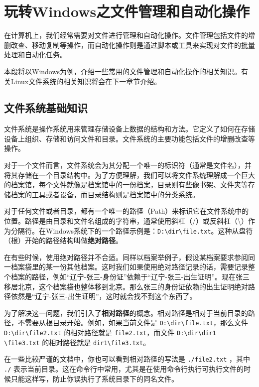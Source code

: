 \documentclass[../main.tex]{subfiles}
\begin{document}
\section{玩转Windows之文件管理和自动化操作}\label{sec:windows-file-management}

在计算机上，我们经常需要对文件进行管理和自动化操作。文件管理包括文件的增删改查、移动复制等操作，而自动化操作则是通过脚本或工具来实现对文件的批量处理和自动化任务。

本段将以Windows为例，介绍一些常用的文件管理和自动化操作的相关知识。有关Linux文件系统的相关知识将会在下一章节介绍。

\subsection{文件系统基础知识}

文件系统是操作系统用来管理存储设备上数据的结构和方法。它定义了如何在存储设备上组织、存储和访问文件和目录。文件系统的主要功能包括文件的增删改查等操作。

对于一个文件而言，文件系统会为其分配一个唯一的标识符（通常是文件名），并将其存储在一个目录结构中。为了方便理解，我们可以将文件系统理解成一个巨大的档案馆，每个文件就像是档案馆中的一份档案，目录则有些像书架、文件夹等存储档案的工具或者设备，而目录结构则是档案馆中的分类系统。

对于任何文件或者目录，都有一个唯一的路径（Path）来标识它在文件系统中的位置。路径是由目录和文件名组成的字符串，通常使用斜杠（/）或反斜杠（\textbackslash）作为分隔符。在Windows系统下的一个路径示例是：\texttt{D:\textbackslash dir\textbackslash file.txt}。这种从盘符（根）开始的路径结构叫做\textbf{绝对路径}。

在有些时候，使用绝对路径并不合适。同样以档案举例子，假设某档案要求参阅同一档案袋里的某一份其他档案。这时我们如果使用绝对路径记录的话，需要记录整个档案的路径，例如“辽宁-张三-身份证”依赖于“辽宁-张三-出生证明”。现在张三移居北京，这个档案袋也整体移到北京。那么张三的身份证依赖的出生证明绝对路径依然是“辽宁-张三-出生证明”，这时就会找不到这个东西了。

为了解决这一问题，我们引入了\textbf{相对路径}的概念。相对路径是相对于当前目录的路径，不需要从根目录开始。例如，如果当前文件是 \texttt{D:\textbackslash dir\textbackslash file.txt}，那么文件 \texttt{D:\textbackslash dir\textbackslash file2.txt} 的相对路径就是 \texttt{file2.txt}，而文件 \texttt{D:\textbackslash dir\textbackslash dir1 \textbackslash file3.txt} 的相对路径就是 \texttt{dir1\textbackslash file3.txt}。

在一些比较严谨的文档中，你也可以看到相对路径的写法是 \texttt{./file2.txt} ，其中 \texttt{./} 表示当前目录。这在命令行中常用，尤其是在使用命令行执行可执行文件的时候只能这样写，防止你误执行了系统目录下的同名文件。
\end{document}
